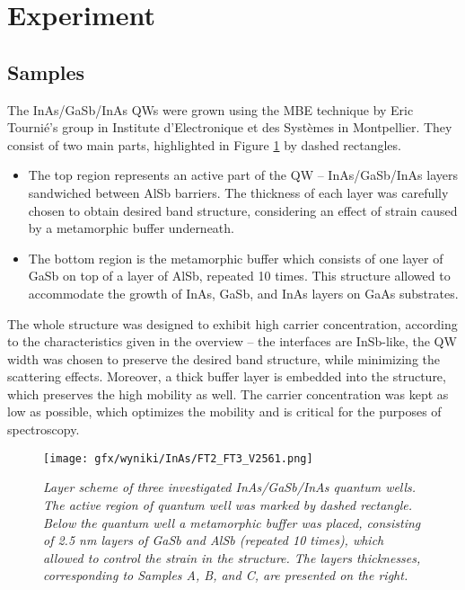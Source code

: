 \documentclass[titlepage,a4paper]{book}
\newcommand{\wciecie}{\quad\phantom{v}}
\begin{document}

\section{Experiment}
\subsection{Samples}
\wciecie
The InAs/GaSb/InAs QWs were grown using the MBE technique by Eric Tournié's group in Institute d'Electronique et des Systèmes in Montpellier. They consist of two main parts, highlighted in Figure \ref{fig:Samples_InAs} by dashed rectangles. 
\begin{itemize}
\item The top region represents an active part of the QW -- InAs/GaSb/InAs layers sandwiched between AlSb barriers. The thickness of each layer was carefully chosen to obtain desired band structure, considering an effect of strain caused by a metamorphic buffer underneath.
\item The bottom region is the metamorphic buffer \cite{Yu_InAs} which consists of one layer of GaSb on top of a layer of AlSb, repeated 10 times. This structure allowed to accommodate the growth of InAs, GaSb, and InAs layers on GaAs substrates.
\end{itemize}

The whole structure was designed to exhibit high carrier concentration, according to the characteristics given in the overview -- the interfaces are InSb-like, the QW width was chosen to preserve the desired band structure, while minimizing the scattering effects. Moreover, a thick buffer layer is embedded into the structure, which preserves the high mobility as well. The carrier concentration was kept as low as possible, which optimizes the mobility and is critical for the purposes of spectroscopy. 
 
\begin{figure}[H]
	\centering
	\texttt{[image: gfx/wyniki/InAs/FT2\_FT3\_V2561.png]}
	\vspace{-10pt}
	\caption{\textit{Layer scheme of three investigated InAs/GaSb/InAs quantum wells. The active region of quantum well was marked by dashed rectangle. Below the quantum well a metamorphic buffer was placed, consisting of 2.5 nm layers of GaSb and AlSb (repeated 10 times), which allowed to control the strain in the structure. The layers thicknesses, corresponding to Samples A, B, and C, are presented on the right.}}
	\label{fig:Samples_InAs}
\end{figure}
\end{document}
